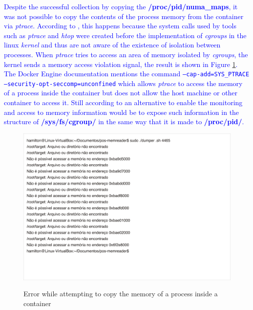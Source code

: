\documentclass[conference]{IEEEtran}
\newcommand{\marcos}[1]{{\color{green}{MARCOS: #1}}}
\begin{document}
\marcos{Não tenho certeza se entendi: que ideia você quer passar com esse parágrafo exatamente? Não consegui enxergar o que a discussão tem a ver com o seu trabalho em si: ela apenas fala de uma ferramenta que (1) você não tinha mencionado antes e (2) não funciona para seus propósitos, sem que isso seja uma limitação do seu trabalho... Enfim, parece meio fora de foco isso...}
\textcolor{blue}{Despite the successful collection by copying the \textbf{/proc/pid/numa\_maps}, it was not possible to copy the contents of the process memory from the container via \textit{ptrace}.
%
According to \cite{cgroupsxptrace}, this happens because the system calls used by tools such as \textit{ptrace} and \textit{htop} were created before the implementation of \textit{cgroups} in the linux \textit{kernel} and thus are not aware of the existence of isolation between processes.
%
When \textit{ptrace} tries to access an area of memory isolated by \textit{cgroups}, the kernel sends a memory access violation signal, the result is shown in Figure \ref{fig:erro-copia-gdb}.
%
The Docker Engine \cite{capabilities} documentation mentions the command \texttt{--cap-add=SYS\_PTRACE --security-opt-seccomp=unconfined} which allows \textit{ptrace} to access the memory of a process inside the container but does not allow the host machine or other container to access it.
%
Still according to \cite{cgroupsxptrace} an alternative to enable the monitoring and access to memory information would be to expose such information in the structure of \textbf{/sys/fs/cgroup/} in the same way that it is made to \textbf{/proc/pid/}.}

\begin{figure}[htb!]
\footnotesize
\caption{Error while attempting to copy the memory of a process inside a container \marcos{Er... o que texto em português está fazendo nesta figura?!?!?!!?}}
\includegraphics[scale=0.21]{nao-consido-dumpar-memoria.jpg}
\centering
\label{fig:erro-copia-gdb}
\end{figure}
\end{document}
